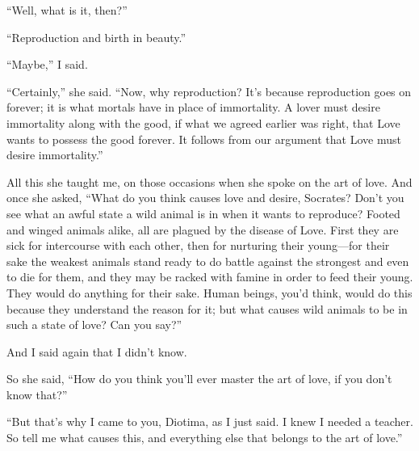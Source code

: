 “Well, what is it, then?”

“Reproduction and birth in beauty.”

“Maybe,” I said.

“Certainly,” she said. “Now, why reproduction? It's because reproduction
 goes on forever; it is what mortals have in place of
immortality. A lover must desire immortality along with the good, if
what we agreed earlier was right, that Love wants to possess the good
forever. It follows from our argument that Love must desire
immortality.”

All this she taught me, on those occasions when she spoke on the art of
love. And once she asked, “What do you think causes love and desire,
Socrates? Don't you see what an awful state a wild animal is in when it
 wants to reproduce? Footed and winged animals alike, all are
plagued by the disease of Love. First they are sick for intercourse with
each other, then for nurturing their young---for their sake the weakest
animals stand ready to do battle against the strongest and even to die
for them, and they may be racked with famine in order to feed their
young. They would do anything for their sake. Human beings, you'd think,
would do this because  they understand the reason for it; but
what causes wild animals to be in such a state of love? Can you say?”

And I said again that I didn't know.

So she said, “How do you think you'll ever master the art of love, if
you don't know that?”

“But that's why I came to you, Diotima, as I just said. I knew I needed
a teacher. So tell me what causes this, and everything else that belongs
to the art of love.”

